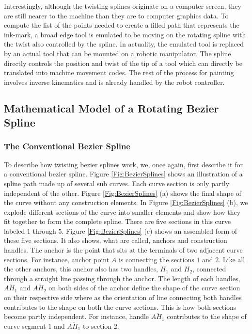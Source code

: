     Interestingly, although the twisting splines originate on a computer screen, they are still nearer to the machine than they are to computer graphics data. To compute the list of the points needed to create a filled path that represents the ink-mark, a broad edge tool is emulated to be moving on the rotating spline with the twist also controlled by the spline. In actuality, the emulated tool is replaced by an actual tool that can be mounted on a robotic manipulator. The spline directly controls the position and twist of the tip of a tool which can directly be translated into machine movement codes. The rest of the process for painting involves inverse kinematics and is already handled by the robot controller.

    \subsection{Mathematical Model of a Rotating Bezier Spline}
    \subsubsection{The Conventional Bezier Spline}
         To describe how twisting bezier splines work, we, once again, first describe it for a conventional bezier spline. Figure \ref{Fig:BezierSplines} shows an illustration of a spline path made up of several sub curves. Each curve section is only partly independent of the other. Figure \ref{Fig:BezierSplines} (a) shows the final shape of the curve without any construction elements. In Figure \ref{Fig:BezierSplines} (b), we explode different sections of the curve into smaller elements and show how they fit together to form the complete spline. There are five sections in this curve labeled $1$ through $5$. Figure \ref{Fig:BezierSplines} (c) shows an assembled form of these five sections. It also shows, what are called, anchors and construction handles. The anchor is the point that sits at the terminals of two adjacent curve sections. For instance, anchor point $A$  is connecting the sections $1$ and $2$. Like all the other anchors, this anchor also has two handles, $H_1$ and $H_2$, connected through a straight line passing through the anchor. The length of each handles, $\overline{AH_1}$  and $\overline{AH_2}$ on both sides of the anchor define the shape of the curve section on their respective side where as the orientation of line connecting both handles contributes to the shape on both the curve sections. This is how both sections become partly independent. For instance, handle $\overline{AH_1}$ contributes to the shape of curve segment $1$ and $\overline{AH_1}$ to section $2$.



